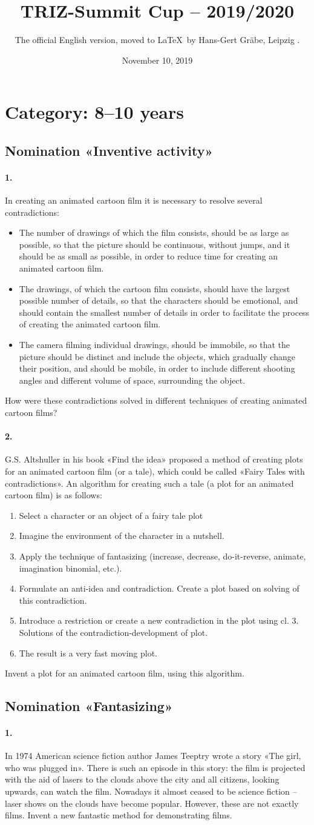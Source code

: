 \documentclass[11pt,a4paper]{article}
\title{TRIZ-Summit Cup – 2019/2020}
\author{The official English version, moved to \LaTeX\ by Hans-Gert Gräbe,
  Leipzig .}
\date{November 10, 2019}
\newcommand{\contradictions}{ In creating an animated cartoon film it is
  necessary to resolve several contradictions:
\begin {itemize}
\item The number of drawings of which the film consists, should be as large as
  possible, so that the picture should be continuous, without jumps, and it
  should be as small as possible, in order to reduce time for creating an
  animated cartoon film.
\item The drawings, of which the cartoon film consists, should have the
  largest possible number of details, so that the characters should be
  emotional, and should contain the smallest number of details in order to
  facilitate the process of creating the animated cartoon film.
\item The camera filming individual drawings, should be immobile, so that the
  picture should be distinct and include the objects, which gradually change
  their position, and should be mobile, in order to include different shooting
  angles and different volume of space, surrounding the object.
\end{itemize}
How were these contradictions solved in different techniques of creating
animated cartoon films?
}
\begin{document}
\maketitle

\section{Category: 8--10 years }

\subsection*{Nomination «Inventive activity»}

\paragraph{1.}
\contradictions

\paragraph{2.}
G.S. Altshuller in his book «Find the idea» proposed a method of creating
plots for an animated cartoon film (or a tale), which could be called «Fairy
Tales with contradictions». An algorithm for creating such a tale (a plot for
an animated cartoon film) is as follows:
\begin{enumerate}
\item Select a character or an object of a fairy tale plot
\item Imagine the environment of the character in a nutshell.
\item Apply the technique of fantasizing (increase, decrease, do-it-reverse,
  animate, imagination binomial, etc.). 
\item Formulate an anti-idea and contradiction. Create a plot based on solving
  of this contradiction. 
\item Introduce a restriction or create a new contradiction in the plot using
  cl. 3. Solutions of the contradiction-development of plot.
\item The result is a very fast moving plot.
\end{enumerate}
Invent a plot for an animated cartoon film, using this algorithm.

\subsection*{Nomination «Fantasizing»}

\paragraph{1.}
In 1974 American science fiction author James Teeptry wrote a story «The girl,
who was plugged in». There is such an episode in this story: the film is
projected with the aid of lasers to the clouds above the city and all
citizens, looking upwards, can watch the film. Nowadays it almost ceased to be
science fiction – laser shows on the clouds have become popular. However,
these are not exactly films. Invent a new fantastic method for demonstrating
films.
\end{document}

